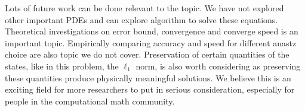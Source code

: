 \documentclass[11pt]{article}
\theoremstyle{definition}
\begin{document}
Lots of future work can be done relevant to the topic. We have not explored other important PDEs and can explore algorithm to solve these equations. Theoretical investigations on error bound, convergence and converge speed is an important topic. Empirically comparing accuracy and speed for different anastz choice are also topic we do not cover. Preservation of certain quantities of the states, like in this problem, the $\ell_1$ norm, is also worth considering as preserving these quantities produce physically meaningful solutions. We believe this is an exciting field for more researchers to put in serious consideration, especially for people in the computational math community.






\nocite{*}



\end{document}
